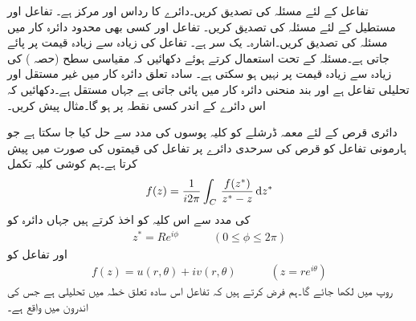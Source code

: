 
\quad
تفاعل  کے لئے مسئلہ  کی تصدیق کریں۔دائرے کا رداس  اور مرکز  ہے۔
\quad
تفاعل  اور مستطیل  کے لئے مسئلہ  کی تصدیق کریں۔
\quad
تفاعل  اور کسی بھی محدود دائرہ کار میں مسئلہ  کی تصدیق کریں۔اشارہ۔  یک سر ہے۔
\quad
تفاعل  کی زیادہ سے زیادہ قیمت  پر پائے جاتی ہے۔مسئلہ  کے تحت استعمال کرتے ہوئے دکھائیں کہ  مقیاسی سطح   (حصہ ) کی زیادہ سے زیادہ قیمت  پر نہیں ہو سکتی ہے۔
\quad
سادہ تعلق دائرہ کار  میں  غیر مستقل اور تحلیلی تفاعل ہے اور بند منحنی  دائرہ کار  میں پائی جاتی ہے جہاں  مستقل ہے۔دکھائیں کہ  اس دائرے کے اندر کسی نقطہ پر ہو گا۔مثال پیش کریں۔

دائری قرص کے لئے معمہ ڈرشلے کو کلیہ پوسوں کی مدد سے حل کیا جا سکتا ہے جو ہارمونی تفاعل کو قرص کی سرحدی دائرے پر تفاعل کی قیمتوں کی صورت میں پیش کرتا ہے۔ہم کوشی کلیہ تکمل
\begin{align}\label{مساوات_مخفی_معمہ_الف}
f(z)=\frac{1}{i2\pi}\int_C\,\frac{f(z^*)}{z^*-z}\dif z^*
\end{align}
 کی مدد سے اس کلیہ کو اخذ کرتے ہیں جہاں دائرہ  کو
\begin{align*}
z^*=Re^{i\phi}\quad\quad\quad (0\le \phi\le 2\pi)
\end{align*}
اور تفاعل کو
\begin{align*}
f(z)=u(r,\theta)+iv(r,\theta)\quad \quad \quad (z=re^{i\theta})
\end{align*}
روپ میں لکھا جائے گا۔ہم فرض کرتے ہیں کہ تفاعل اس سادہ تعلق خطہ میں تحلیلی ہے جس کی اندرون میں  واقع ہے۔

